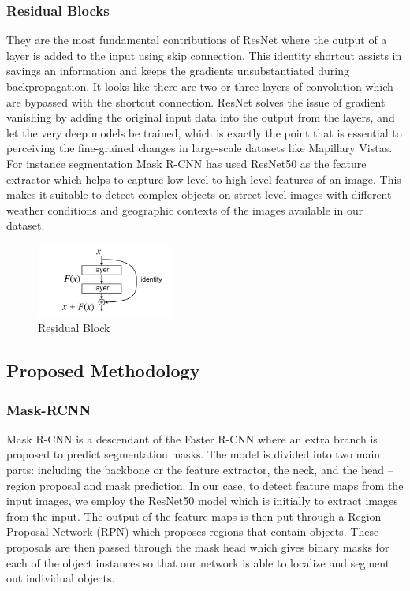 \documentclass[conference]{IEEEtran}
\begin{document}
\subsubsection{Residual Blocks}
They are the most fundamental contributions of ResNet where the output of a layer is added to the input using skip connection. This identity shortcut assists in savings an information and keeps the gradients unsubstantiated during backpropagation. It looks like there are two or three layers of convolution which are bypassed with the shortcut connection. ResNet solves the issue of gradient vanishing by adding the original input data into the output from the layers, and let the very deep models be trained, which is exactly the point that is essential to perceiving the fine-grained changes in large-scale datasets like Mapillary Vistas.
\\
For instance segmentation Mask R-CNN has used ResNet50 as the feature extractor which helps to capture low level to high level features of an image. This makes it suitable to detect complex objects on street level images with different weather conditions and geographic contexts of the images available in our dataset.
\\
\begin{figure}[htbp]
    \centering
    \includegraphics[width=0.40\textwidth]{ResBlock.jpg} 
    \caption{Residual Block}
    \label{fig}
\end{figure}
\subsection{Proposed Methodology}
\subsubsection{Mask-RCNN} 
Mask R-CNN is a descendant of the Faster R-CNN where an extra branch is proposed to predict segmentation masks. The model is divided into two main parts: including the backbone or the feature extractor, the neck, and the head – region proposal and mask prediction. In our case, to detect feature maps from the input images, we employ the ResNet50 model which is initially to extract images from the input. The output of the feature maps is then put through a Region Proposal Network (RPN) which proposes regions that contain objects. These proposals are then passed through the mask head which gives binary masks for each of the object instances so that our network is able to localize and segment out individual objects.
\end{document}
